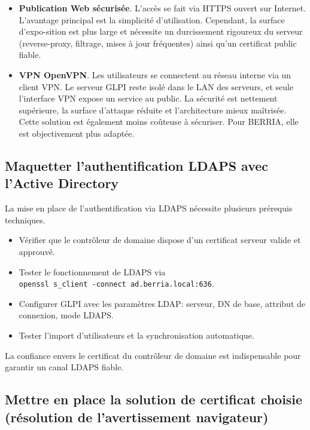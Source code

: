 \begin{itemize}
  \item \textbf{Publication Web sécurisée}. L'accès se fait via HTTPS ouvert sur Internet. L'avantage principal est la simplicité d'utilisation. Cependant, la surface d'expo-sition est plus large et nécessite un durcissement rigoureux du serveur (reverse-proxy, filtrage, mises à jour fréquentes) ainsi qu'un certificat public fiable.
  \item \textbf{VPN OpenVPN}. Les utilisateurs se connectent au réseau interne via un client VPN. Le serveur GLPI reste isolé dans le LAN des serveurs, et seule l'interface VPN expose un service au public. La sécurité est nettement supérieure, la surface d'attaque réduite et l'architecture mieux maîtrisée. Cette solution est également moins coûteuse à sécuriser. Pour BERRIA, elle est objectivement plus adaptée.
\end{itemize}

\newpage

\subsection*{Maquetter l'authentification LDAPS avec l'Active Directory}
{}

\noindent La mise en place de l'authentification via LDAPS nécessite plusieurs prérequis techniques.

\begin{itemize}
  \item Vérifier que le contrôleur de domaine dispose d'un certificat serveur valide et approuvé.
  \item Tester le fonctionnement de LDAPS via \\ \texttt{openssl s\_client -connect ad.berria.local:636}.
  \item Configurer GLPI avec les paramètres LDAP: serveur, DN de base, attribut de connexion, mode LDAPS.
  \item Tester l'import d'utilisateurs et la synchronisation automatique.
\end{itemize}

\noindent La confiance envers le certificat du contrôleur de domaine est indispensable pour garantir un canal LDAPS fiable.

\medskip

\subsection*{Mettre en place la solution de certificat choisie (résolution de l'avertissement navigateur)}
{}

